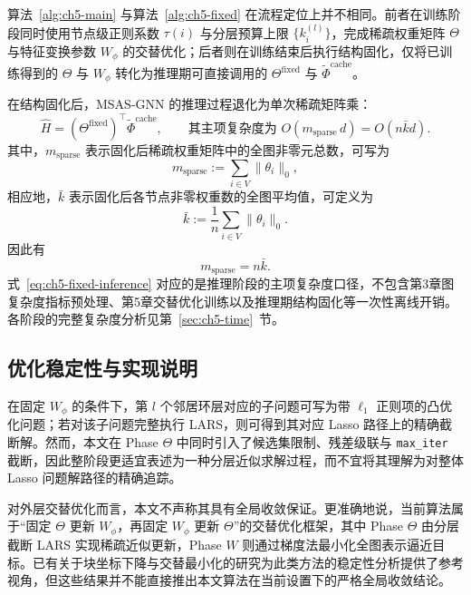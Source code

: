算法~\ref{alg:ch5-main} 与算法~\ref{alg:ch5-fixed} 在流程定位上并不相同。前者在训练阶段同时使用节点级正则系数 $\tau(i)$ 与分层预算上限 $\{k_i^{(l)}\}$，完成稀疏权重矩阵 $\Theta$ 与特征变换参数 $W_\phi$ 的交替优化；后者则在训练结束后执行结构固化，仅将已训练得到的 $\Theta$ 与 $W_\phi$ 转化为推理期可直接调用的 $\Theta^{\text{fixed}}$ 与 $\tilde{\Phi}^{\text{cache}}$。

在结构固化后，MSAS-GNN 的推理过程退化为单次稀疏矩阵乘：
\begin{equation}
  \hat{H} = (\Theta^{\text{fixed}})^\top \tilde{\Phi}^{\text{cache}},
  \qquad
  \text{其主项复杂度为 } O(m_{\text{sparse}}\,d)=O(n\bar{k}d).
  \label{eq:ch5-fixed-inference}
\end{equation}
其中，$m_{\text{sparse}}$ 表示固化后稀疏权重矩阵中的全图非零元总数，可写为
\begin{equation}
  m_{\text{sparse}}:=\sum_{i\in V}\|\theta_i\|_0,
  \label{eq:ch5-msparse}
\end{equation}
相应地，$\bar{k}$ 表示固化后各节点非零权重数的全图平均值，可定义为
\begin{equation}
  \bar{k}:=\frac{1}{n}\sum_{i\in V}\|\theta_i\|_0.
  \label{eq:ch5-kbar}
\end{equation}
因此有
\begin{equation}
  m_{\text{sparse}} = n\bar{k}.
  \label{eq:ch5-msparse-kbar}
\end{equation}
式~\eqref{eq:ch5-fixed-inference} 对应的是推理阶段的主项复杂度口径，不包含第3章图复杂度指标预处理、第5章交替优化训练以及推理期结构固化等一次性离线开销。各阶段的完整复杂度分析见第~\ref{sec:ch5-time}~节。

\subsection{优化稳定性与实现说明}
\label{subsec:ch5-convergence}

在固定 $W_\phi$ 的条件下，第 $l$ 个邻居环层对应的子问题可写为带 $\ell_1$ 正则项的凸优化问题；若对该子问题完整执行 LARS，则可得到其对应 Lasso 路径上的精确截断解。然而，本文在 Phase $\Theta$ 中同时引入了候选集限制、残差级联与 \texttt{max\_iter} 截断，因此整阶段更适宜表述为一种分层近似求解过程，而不宜将其理解为对整体 Lasso 问题解路径的精确追踪。

对外层交替优化而言，本文不声称其具有全局收敛保证。更准确地说，当前算法属于“固定 $\Theta$ 更新 $W_\phi$，再固定 $W_\phi$ 更新 $\Theta$”的交替优化框架，其中 Phase $\Theta$ 由分层截断 LARS 实现稀疏近似更新，Phase $W$ 则通过梯度法最小化全图表示逼近目标。已有关于块坐标下降与交替最小化的研究\cite{Tseng2001,Razaviyayn2013}为此类方法的稳定性分析提供了参考视角，但这些结果并不能直接推出本文算法在当前设置下的严格全局收敛结论。

